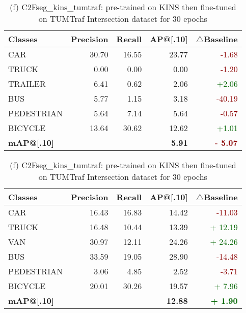 \begin{table}[htbp]
	\vspace{15pt}
	
	\begin{minipage}[t]{0.48\textwidth}
		\centering
		\scriptsize
		\setlength\tabcolsep{4pt}
		\begin{tabular}{lrrrr}
			\toprule
			\textbf{Classes} & \textbf{Precision} & \textbf{Recall} & \textbf{AP@[.10]} & \textbf{$\triangle$Baseline} \\
			\midrule
			CAR & 30.70 & 16.55 & 23.77 & \textcolor{darkred}{-1.68} \\
			TRUCK & 0.00 & 0.00 & 0.00 & \textcolor{darkred}{-1.20} \\
			TRAILER & 6.41 & 0.62 & 2.06 & \textcolor{darkgreen}{+2.06} \\
			BUS & 5.77 & 1.15 & 3.18 & \textcolor{darkred}{-40.19} \\
			PEDESTRIAN & 5.64 & 7.14 & 5.64 & \textcolor{darkred}{-0.57} \\
			BICYCLE & 13.64 & 30.62 & 12.62 & \textcolor{darkgreen}{+1.01}\\
			\midrule
			\textbf{mAP@[.10]} & \textbf{} & \textbf{} & \textbf{5.91} & \textbf{\textcolor{darkred}{- 5.07}}  \\
			\bottomrule
		\end{tabular}
		\caption*{(e) YOLOv8x\_nuImg: trained on nuImages dataset for 50 epochs at resolution 1280 x 1280}
	\end{minipage}
	\hfill
	\begin{minipage}[t]{0.48\textwidth}
		\centering
		\scriptsize
		\setlength\tabcolsep{4pt}
		\begin{tabular}{lrrrr}
			\toprule
			\textbf{Classes} & \textbf{Precision} & \textbf{Recall} & \textbf{AP@[.10]} & \textbf{$\triangle$Baseline} \\
			\midrule
			CAR & 16.43 & 16.83 & 14.42 & \textcolor{darkred}{-11.03} \\
			TRUCK & 16.48 & 10.44 & 13.39 & \textcolor{darkgreen}{+ 12.19} \\
			VAN & 30.97 & 12.11 & 24.26 & \textcolor{darkgreen}{+ 24.26} \\
			BUS & 33.59 & 19.05 & 28.90 & \textcolor{darkred}{-14.48} \\
			PEDESTRIAN & 3.06 & 4.85 & 2.52 & \textcolor{darkred}{-3.71} \\
			BICYCLE & 20.01 & 30.26 & 19.57 & \textcolor{darkgreen}{+ 7.96} \\
			\midrule
			\textbf{mAP@[.10]} & \textbf{} & \textbf{} & \textbf{12.88} & \textbf{\textcolor{darkgreen}{+ 1.90}} \\
			\bottomrule
		\end{tabular}
		\caption*{(f) C2Fseg\_kins\_tumtraf: pre-trained on KINS then fine-tuned on TUMTraf Intersection dataset for 30 epochs}
	\end{minipage}


\end{table}
